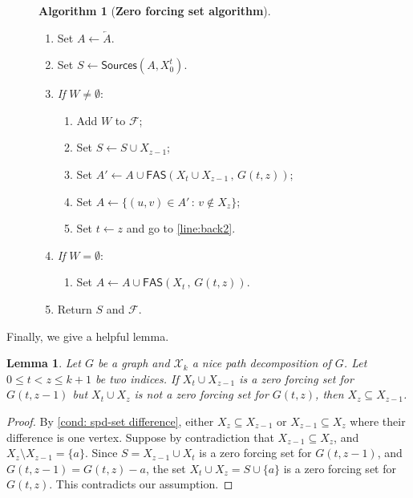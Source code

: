 \documentclass[12pt]{amsart}
\theoremstyle{plain}
\newtheorem{lemma}[theorem]{Lemma}
\theoremstyle{definition}
\newtheorem{algorithm}[definition]{Algorithm}
\def\F{\mathcal F}
\def\X{\mathcal X}
\renewcommand{\subset}{\subseteq}
\newcommand{\sources}{\mathsf{Sources}}
\newcommand{\fas}{\mathsf{FAS}}
\begin{document}
\begin{figure}[ht]
\begin{mdframed}[style=MyFrame,align=center]
{\begin{algorithm}[{\bf Zero forcing set algorithm}]
\begin{enumerate}[label=(L\thealgct)]
    \item\label{line:revA} Set $A\leftarrow \overleftarrow{A}$.
    \item\label{line:newSource} Set $S\leftarrow \sources(A,X_0^t)$.
        \item\label{line:non-fin} {\em If} $W\neq\emptyset$: 
    \begin{enumerate}[label=(L\thealgct\alph*)]
        \item Add $W$ to $\F$;
        \item\label{line:S} Set $S\leftarrow S\cup X_{z-1}$; 
         \item\label{line:fas} Set $A'\leftarrow {A}\cup\fas(X_{t}\cup X_{z-1}\,,\,G(t,z))$;
        \item\label{line:removal} Set $A\leftarrow \{(u,v)\in A'\,:\, v\not\in X_{z}\}$; 
        \item\label{line:exit} Set $t\leftarrow z$ and go to \ref{line:back2}.
    \end{enumerate}
    \item\label{line:Wempty} {\em If} $W=\emptyset$: 
    \begin{enumerate}[label=(L\thealgct\alph*)]
        \item Set $A\leftarrow {A}\cup\fas(X_{t}\,,\,G(t,z))$.
    \end{enumerate}
    \item\label{line: return}  Return $S$ and $\F$.
\end{enumerate}
\end{algorithm}
}

\end{mdframed}
\end{figure}

Finally, we give a helpful lemma.
\begin{lemma}\label{lemma: s}
Let $G$ be a graph and $\X_k$  a nice path decomposition of $G$. 
Let $0\leq t< z\leq k+1$ be two indices. 
If $X_t\cup X_{z-1}$ is a zero forcing set for $G(t,z-1)$ but $X_t\cup X_{z}$ is not a zero forcing set for $G(t,z)$, then $X_{z}\subset X_{z-1}$. 
\end{lemma}
\begin{proof}
By \ref{cond: spd-set difference}, either $X_z \subset X_{z-1}$ or $X_{z-1}\subset X_{z}$ where their difference is one vertex. 
Suppose by contradiction that $X_{z-1}\subset X_z$, and $X_z\setminus X_{z-1}= \{a\}$. Since $S= X_{z-1}\cup X_t$ is a zero forcing set for $G(t,z-1)$, and $G(t,z-1)=G(t,z)-a$, the set $X_t\cup X_z=S\cup \{ a\}$ is a zero forcing set for $G(t,z)$. This contradicts our assumption.
\end{proof}
\end{document}
